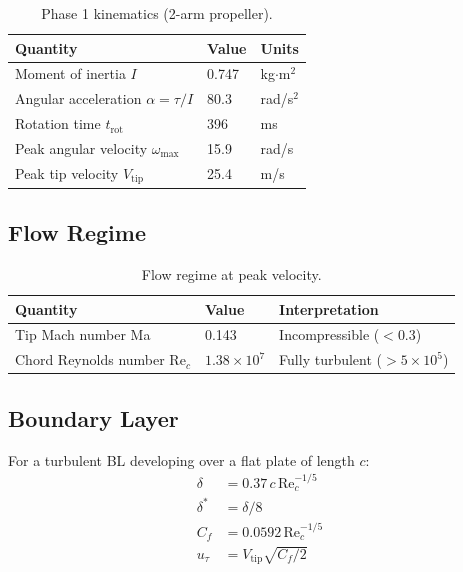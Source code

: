 \documentclass[11pt,a4paper]{article}
\begin{document}
\begin{table}[H]
\centering
\caption{Phase 1 kinematics (2-arm propeller).}
\label{tab:phase1_kin}
\begin{tabular}{lll}
\toprule
Quantity & Value & Units \\
\midrule
Moment of inertia $I$ & 0.747 & kg$\cdot$m$^2$ \\
Angular acceleration $\alpha = \tau/I$ & 80.3 & rad/s$^2$ \\
Rotation time $t_\mathrm{rot}$ & 396 & ms \\
Peak angular velocity $\omega_\mathrm{max}$ & 15.9 & rad/s \\
Peak tip velocity $V_\mathrm{tip}$ & 25.4 & m/s \\
\bottomrule
\end{tabular}
\end{table}

\subsection{Flow Regime}

\begin{table}[H]
\centering
\caption{Flow regime at peak velocity.}
\label{tab:regime}
\begin{tabular}{lll}
\toprule
Quantity & Value & Interpretation \\
\midrule
Tip Mach number Ma & 0.143 & Incompressible ($< 0.3$) \\
Chord Reynolds number Re$_c$ & $1.38 \times 10^7$ & Fully turbulent ($> 5 \times 10^5$) \\
\bottomrule
\end{tabular}
\end{table}

\subsection{Boundary Layer}

For a turbulent BL developing over a flat plate of length $c$:
\begin{align}
  \delta &= 0.37\,c\,\mathrm{Re}_c^{-1/5} \\
  \delta^* &= \delta/8 \\
  C_f &= 0.0592\,\mathrm{Re}_c^{-1/5} \\
  u_\tau &= V_\mathrm{tip}\sqrt{C_f/2}
\end{align}
\end{document}
